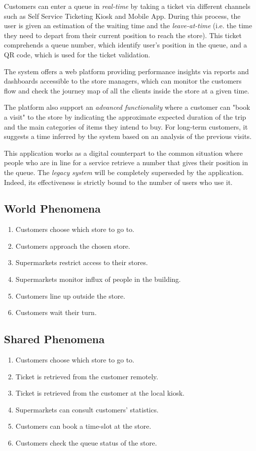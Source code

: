 Customers can enter a queue in \textit{real-time} by taking a ticket via different channels such as Self Service Ticketing Kiosk and Mobile App. During this process, the user is given an estimation of the waiting time and the \textit{leave-at-time} (i.e. the time they need to depart from their current position to reach the store). This ticket comprehends a queue number, which identify user's position in the queue, and a QR code, which is used for the ticket validation.

The system offers a web platform providing performance insights via reports and dashboards accessible to the store managers, which can monitor the customers flow and check the journey map of all the clients inside the store at a given time.

The platform also support an \textit{advanced functionality} where a customer can "book a visit" to the store by indicating the approximate expected duration of the trip and the main categories of items they intend to buy. For long-term customers, it suggests a time inferred by the system based on an analysis of the previous visits.

This application works as a digital counterpart to the common situation where people who are in line for a service retrieve a number that gives their position in the queue. The \textit{legacy system} will be completely superseded by the application. Indeed, its effectiveness is strictly bound to the number of users who use it.

\subsection{World Phenomena}
\begin{enumerate}[label=\textbf{WP.\arabic*}, leftmargin=+.425in]
	\item Customers choose which store to go to.
	\item Customers approach the chosen store.
	\item Supermarkets restrict access to their stores.
	\item Supermarkets monitor influx of people in the building.
	\item Customers line up outside the store.
	\item Customers wait their turn.
\end{enumerate}

\subsection{Shared Phenomena}
\begin{enumerate}[label=\textbf{SP.\arabic*}]
	\item Customers choose which store to go to.
	\item Ticket is retrieved from the customer remotely.
	\item Ticket is retrieved from the customer at the local kiosk.
	\item Supermarkets can consult customers' statistics.
	\item Customers can book a time-slot at the store.
	\item Customers check the queue status of the store.
\end{enumerate}

